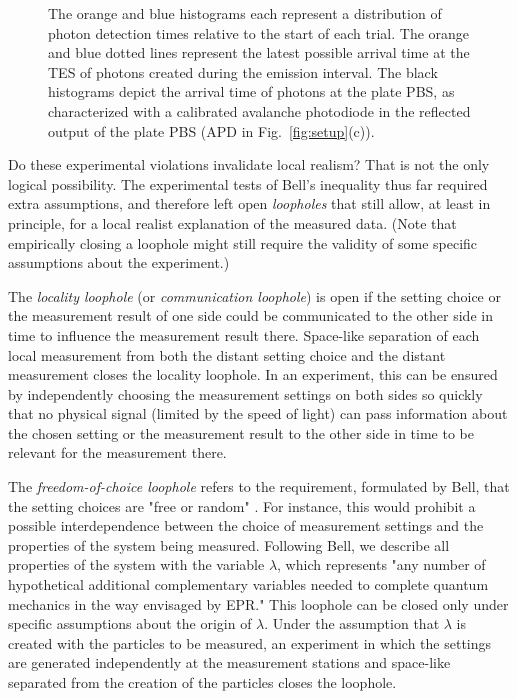 \documentclass[superscriptaddress,twocolumn]{revtex4-1}
\begin{document}
\begin{figure}[htp]
{The orange and blue histograms each represent a distribution of photon detection times relative to the start of each trial. The orange and blue dotted lines represent the latest possible arrival time at the TES of photons created during the emission interval. The black histograms depict the arrival time of photons at the plate PBS, as characterized with a calibrated avalanche photodiode in the reflected output of the plate PBS (APD in Fig.~\ref{fig:setup}(c)).  \label{fig:spacetime}
	}
\end{figure}


Do these experimental violations invalidate local realism? That is not the only logical possibility. The experimental tests of Bell’s inequality thus far required extra assumptions, and therefore left open \textit{loopholes}  that still allow, at least in principle, for a local realist explanation of the measured data. (Note that empirically closing a loophole might still require the validity of some specific assumptions about the experiment.)

The \textit{locality loophole} (or \textit{communication loophole}) is open if the setting choice or the measurement result of one side could be communicated to the other side in time to influence the measurement result there. Space-like separation of each local measurement from both the distant setting choice and the distant measurement closes the locality loophole. In an experiment, this can be ensured by independently choosing the measurement settings on both sides so quickly that no physical signal (limited by the speed of light) can pass information about the chosen setting or the measurement result to the other side in time to be relevant for the measurement there.




The \textit{freedom-of-choice loophole} refers to the requirement, formulated by Bell, that the setting choices are "free or random" \cite{Bell1990}. For instance, this would prohibit a possible interdependence between the choice of measurement settings and the  properties of the system being measured. Following  Bell, we describe all properties of the system with the variable $\lambda$, which represents "any number of hypothetical additional complementary variables needed to complete quantum mechanics in the way envisaged by EPR." \cite{Bell1990} 
This loophole can be closed only under specific assumptions about the origin of $\lambda$. Under the assumption that $\lambda$ is created with the particles to be measured, an experiment in which the settings are generated independently at the measurement stations and space-like separated from the creation of the particles closes the loophole. 
\end{document}
